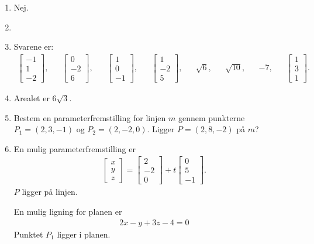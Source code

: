 \begin{enumerate}
	\item Nej.
	
	\item  	\item Svarene er:
	\begin{align*}
	\begin{bmatrix}
	-1\\1\\-2
	\end{bmatrix},&&\begin{bmatrix}
	0\\-2\\6
	\end{bmatrix},&&\begin{bmatrix}
	1\\0\\-1
	\end{bmatrix},&&\begin{bmatrix}
	1\\-2\\5
	\end{bmatrix},&&\sqrt{6},&&\sqrt{10},&&-7,&& \begin{bmatrix}
	1\\3\\1
	\end{bmatrix}.
	\end{align*}
	
	\item Arealet er $ 6\sqrt{3}$.
	
	\item Bestem en parameterfremstilling for linjen $m$ gennem punkterne $P_1 =
	(2, 3,-1)$ og $P_2 = (2,-2, 0)$. Ligger $P = (2, 8, -2)$ på $m$?
	
	\item En mulig parameterfremstilling er
	\begin{align*}
	\begin{bmatrix}
	x\\y\\z
	\end{bmatrix}=\begin{bmatrix}
	2\\-2\\0
	\end{bmatrix}+t \begin{bmatrix}
	0\\5\\-1
	\end{bmatrix}.
	\end{align*}
	$P$ ligger på linjen.
	
	
	En mulig ligning for planen er
	\begin{align*}
	2x-y+3z-4=0
	\end{align*}
	Punktet $P_1$ ligger i planen.
	
\end{enumerate}